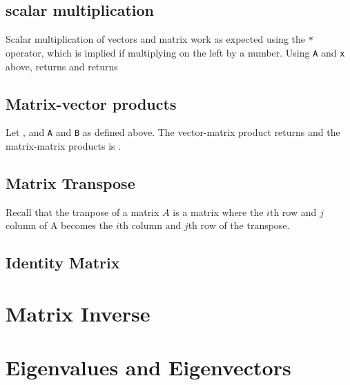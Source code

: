 \subsection{scalar multiplication} 

Scalar multiplication of vectors and matrix work as expected using the \verb!*! operator, which is implied if multiplying on the left by a number. Using \verb!A! and \verb!x! above,  returns  \printpythontex[verbatim]
%
and  returns  \printpythontex[verbatim]

\subsection{Matrix-vector products}

Let , and \verb!A! and \verb!B! as defined above.  The vector-matrix product  returns  \printpythontex[verbatim] and the matrix-matrix products  is . 


\subsection{Matrix Transpose}

Recall that the tranpose of a matrix $A$ is a matrix where the $i$th row and $j$ column of A becomes the $i$th column and $j$th row of the transpose.  

\subsection{Identity Matrix}

\section{Matrix Inverse}


\section{Eigenvalues and Eigenvectors}




